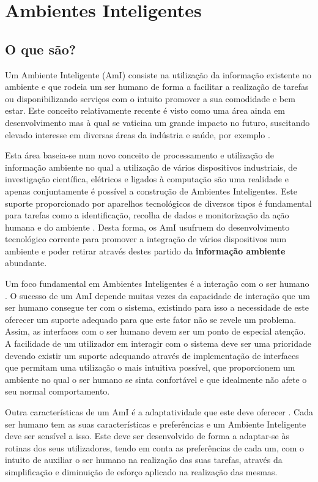 \chapter{Ambientes Inteligentes}

\section{O que são?}

Um Ambiente Inteligente (AmI) \cite{ducatel2001scenarios, ducatel2003ambient} consiste na utilização da informação existente no ambiente e que rodeia um ser humano de forma a facilitar a realização de tarefas ou disponibilizando serviços com o intuito promover a sua comodidade e bem estar. Este conceito relativamente recente é visto como uma área ainda em desenvolvimento mas à qual se vaticina um grande impacto no futuro, suscitando elevado interesse em diversas áreas da indústria e saúde, por exemplo \cite{aarts2006into}.

Esta área baseia-se num novo conceito de processamento e utilização de informação ambiente no qual a utilização de vários dispositivos industriais, de investigação científica, elétricos e ligados à computação são uma realidade e apenas conjuntamente é possível a construção de Ambientes Inteligentes. Este suporte proporcionado por aparelhos tecnológicos de diversos tipos é fundamental para tarefas como a identificação, recolha de dados e monitorização da ação humana e do ambiente \cite{ducatel2001scenarios}. Desta forma, os AmI usufruem do desenvolvimento tecnológico corrente para promover a integração de vários dispositivos num ambiente e poder retirar através destes partido da \textbf{informação ambiente} abundante.

Um foco fundamental em Ambientes Inteligentes é a interação com o ser humano \cite{aarts2006into}. O sucesso de um AmI depende muitas vezes da capacidade de interação que um ser humano consegue ter com o sistema, existindo para isso a necessidade de este oferecer um suporte adequado para que este fator não se revele um problema. Assim, as interfaces com o ser humano devem ser um ponto de especial atenção. A facilidade de um utilizador em interagir com o sistema deve ser uma prioridade devendo existir um suporte adequando através de implementação de interfaces que permitam uma utilização o mais intuitiva possível, que proporcionem um ambiente no qual o ser humano se sinta confortável e que idealmente não afete o seu normal comportamento.

Outra características de um AmI é a adaptatividade que este deve oferecer \cite{aarts2006into}. Cada ser humano tem as suas características e preferências e um Ambiente Inteligente deve ser sensível a isso. Este deve ser desenvolvido de forma a adaptar-se às rotinas dos seus utilizadores, tendo em conta as preferências de cada um, com o intuito de auxiliar o ser humano na realização das suas tarefas, através da simplificação e diminuição de esforço aplicado na realização das mesmas.

